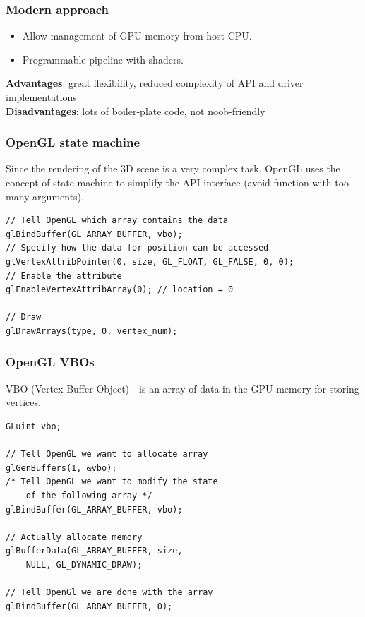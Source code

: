 \begin{frame}[fragile]

\frametitle{Modern approach}

\begin{itemize}
    \item{Allow management of GPU memory from host CPU.}
    \item{Programmable pipeline with shaders.}
\end{itemize}

\vspace{5mm}
\textbf{Advantages}: great flexibility, reduced complexity of API and driver implementations
\newline
\\
\textbf{Disadvantages}: lots of boiler-plate code, not noob-friendly

\end{frame}


\begin{frame}[fragile]

\frametitle{OpenGL state machine}

Since the rendering of the 3D scene is a very complex task, OpenGL uses
the concept of state machine to simplify the API interface (avoid function
with too many arguments).

\begin{center}
\begin{lstlisting}
// Tell OpenGL which array contains the data
glBindBuffer(GL_ARRAY_BUFFER, vbo);
// Specify how the data for position can be accessed
glVertexAttribPointer(0, size, GL_FLOAT, GL_FALSE, 0, 0);
// Enable the attribute
glEnableVertexAttribArray(0); // location = 0

// Draw
glDrawArrays(type, 0, vertex_num);
\end{lstlisting}
\end{center}

\end{frame}


\begin{frame}[fragile]

\frametitle{OpenGL VBOs}

VBO (Vertex Buffer Object) - is an array of data in the GPU memory for storing vertices.

\vspace{5mm}

\begin{lstlisting}
GLuint vbo;

// Tell OpenGL we want to allocate array
glGenBuffers(1, &vbo);
/* Tell OpenGL we want to modify the state
    of the following array */
glBindBuffer(GL_ARRAY_BUFFER, vbo);

// Actually allocate memory
glBufferData(GL_ARRAY_BUFFER, size,
    NULL, GL_DYNAMIC_DRAW);

// Tell OpenGl we are done with the array
glBindBuffer(GL_ARRAY_BUFFER, 0);
\end{lstlisting}

\end{frame}

